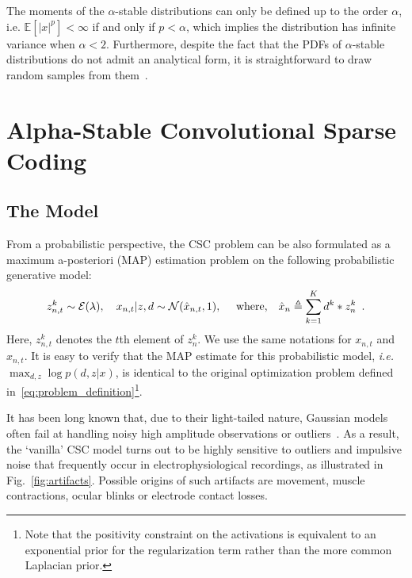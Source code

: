 The moments of the $\alpha$-stable distributions can only be defined up to the order $\alpha$, i.e. $\mathds{E}[|x|^p] < \infty $ if and only if $p <\alpha$, which implies the distribution has infinite variance when $\alpha<2$. Furthermore, despite the fact that the PDFs of $\alpha$-stable distributions do not admit an analytical form, it is straightforward to draw random samples from them~\cite{chambers1976method}.





\section{Alpha-Stable Convolutional Sparse Coding}

\subsection{The Model}


From a probabilistic perspective, the CSC problem can be also formulated as a maximum a-posteriori (MAP) estimation problem on the following probabilistic generative model:
%
\begin{align}
z_{n,t}^k \sim {\cal E}(\lambda),
\quad x_{n,t} | z, d \sim {\cal N}( \hat{x}_{n,t},1 ),
\quad \text{ where,}
\quad \hat{x}_n \triangleq \sum_{k=1}^{K}d^{k} * z_{n}^{k} \enspace .
\label{eqn:csc_prob}
\end{align}
%
Here, $z_{n,t}^k$ denotes the $t$th element of $z_{n}^k$. We use the same notations for $x_{n,t}$ and $\hat{x}_{n,t}$. It is easy to verify that the MAP estimate for this probabilistic model, \textit{i.e.}\ $\max_{d,z} \log p(d,z|x)$, is identical to the original optimization problem defined in~\eqref{eq:problem_definition}\footnote{Note that the positivity constraint on the activations is equivalent to an exponential prior for the regularization term rather than the more common Laplacian prior.}.

It has been long known that, due to their light-tailed nature, Gaussian models often fail at handling noisy high amplitude observations or outliers~\cite{Huber81a}. As a result, the `vanilla' CSC model turns out to be highly sensitive to outliers and impulsive noise that frequently occur in electrophysiological recordings, as illustrated in Fig.~\ref{fig:artifacts}. Possible origins of such artifacts are movement, muscle contractions, ocular blinks or electrode contact losses.


